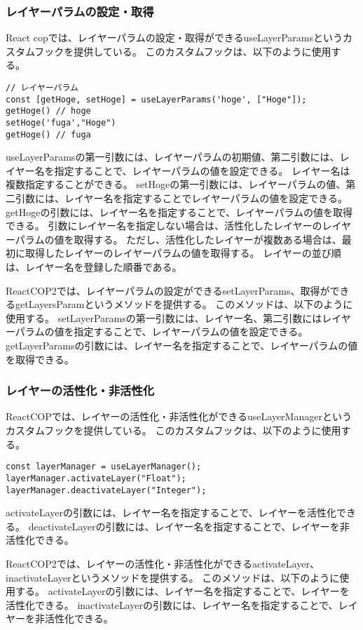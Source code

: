 \documentclass{jsarticle}
\begin{document}
\subsubsection{レイヤーパラムの設定・取得}
React copでは、レイヤーパラムの設定・取得ができるuseLayerParamsというカスタムフックを提供している。
このカスタムフックは、以下のように使用する。
\begin{lstlisting}[]      
// レイヤーパラム
const [getHoge, setHoge] = useLayerParams('hoge', ["Hoge"]);
getHoge() // hoge
setHoge('fuga',"Hoge")
getHoge() // fuga

\end{lstlisting}
useLayerParamsの第一引数には、レイヤーパラムの初期値、第二引数には、レイヤー名を指定することで、レイヤーパラムの値を設定できる。
レイヤー名は複数指定することができる。
setHogeの第一引数には、レイヤーパラムの値、第二引数には、レイヤー名を指定することでレイヤーパラムの値を設定できる。
getHogeの引数には、レイヤー名を指定することで、レイヤーパラムの値を取得できる。
引数にレイヤー名を指定しない場合は、活性化したレイヤーのレイヤーパラムの値を取得する。
ただし、活性化したレイヤーが複数ある場合は、最初に取得したレイヤーのレイヤーパラムの値を取得する。
レイヤーの並び順は、レイヤー名を登録した順番である。

ReactCOP2では、レイヤーパラムの設定ができるsetLayerParams、取得ができるgetLayersParamというメソッドを提供する。
このメソッドは、以下のように使用する。
setLayerParamsの第一引数には、レイヤー名、第二引数にはレイヤーパラムの値を指定することで、レイヤーパラムの値を設定できる。
getLayerParamsの引数には、レイヤー名を指定することで、レイヤーパラムの値を取得できる。

\subsubsection{レイヤーの活性化・非活性化}
ReactCOPでは、レイヤーの活性化・非活性化ができるuseLayerManagerというカスタムフックを提供している。
このカスタムフックは、以下のように使用する。
\begin{lstlisting}[]
const layerManager = useLayerManager();
layerManager.activateLayer("Float");
layerManager.deactivateLayer("Integer");
\end{lstlisting}
activateLayerの引数には、レイヤー名を指定することで、レイヤーを活性化できる。
deactivateLayerの引数には、レイヤー名を指定することで、レイヤーを非活性化できる。

ReactCOP2では、レイヤーの活性化・非活性化ができるactivateLayer、inactivateLayerというメソッドを提供する。
このメソッドは、以下のように使用する。
activateLayerの引数には、レイヤー名を指定することで、レイヤーを活性化できる。
inactivateLayerの引数には、レイヤー名を指定することで、レイヤーを非活性化できる。
\end{document}
